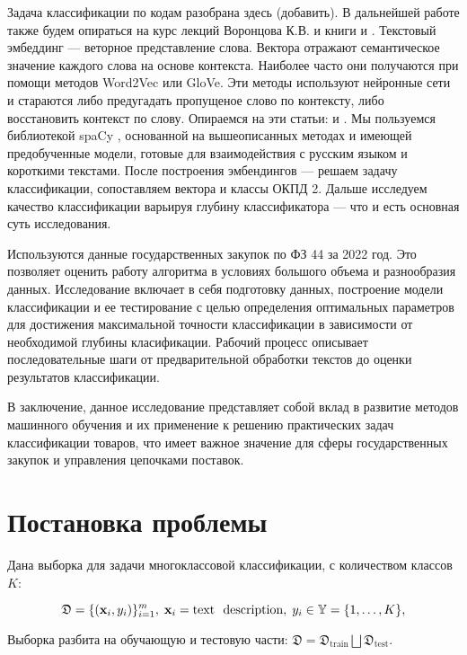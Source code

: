 \documentclass{article}
\begin{document}
Задача классификации по кодам разобрана здесь (добавить). В дальнейшей работе также будем опираться на курс лекций Воронцова К.В. и книги \cite{Goodfellow2016DeepLearning} и \cite{Montani2019AdvancedNLP}. %
Текстовый эмбеддинг --- веторное представление слова. Вектора отражают семантическое значение каждого слова на основе контекста. Наиболее часто они получаются при помощи методов Word2Vec  или GloVe.  Эти методы используют нейронные сети и стараются либо предугадать пропущеное слово по контексту, либо восстановить контекст по слову. Опираемся на эти статьи: \cite{alammarWord2vec} и \cite{munozWordEmbeddings}.  
Мы пользуемся библиотекой spaCy \cite{spacyDocs}, основанной на вышеописанных методах и имеющей предобученные модели, готовые для взаимодействия с русским языком и короткими текстами. После построения эмбендингов --- решаем задачу классификации, сопоставляем вектора и классы ОКПД 2.  Дальше исследуем качество классификации варьируя глубину классификатора --- что и есть основная суть исследования. 

Используются данные государственных закупок по ФЗ 44 за 2022 год. Это позволяет оценить работу алгоритма в условиях большого объема и разнообразия данных. Исследование включает в себя подготовку данных, построение модели классификации и ее тестирование с целью определения оптимальных параметров для достижения максимальной точности классификации в зависимости от необходимой глубины класификации. Рабочий процесс описывает последовательные шаги от предварительной обработки текстов до оценки результатов классификации.

В заключение, данное исследование представляет собой вклад в развитие методов машинного обучения и их применение к решению практических задач классификации товаров, что имеет важное значение для сферы государственных закупок и управления цепочками поставок.

\section{Постановка проблемы}
Дана выборка для задачи многоклассовой классификации, с количеством классов $K$:

$$\mathfrak{D}  = \{(\bold{x}_i, y_i)\}_{i=1}^{m},\; \bold{x}_i = \text{text \ description},\; y_i \in \mathbb{Y}  = \{1, \dots, K\},$$

Выборка разбита на обучающую и тестовую части: $\mathfrak{D} = \mathfrak{D}_\text{train} \bigsqcup \mathfrak{D}_\text{test}$.
\end{document}
